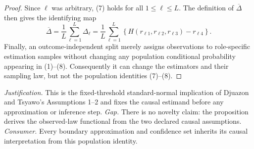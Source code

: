 \documentclass{article}
\begin{document}
\begin{proof}
Since \(\ell\) was arbitrary, (7) holds for all \(1\le \ell\le L\).  The definition of \(\overline\Delta\) then gives the identifying map
\[
\overline\Delta
=\frac{1}{L}\sum_{\ell=1}^{L}\Delta_\ell
=\frac{1}{L}\sum_{\ell=1}^{L}
\left\{H(r_{\ell1},r_{\ell2},r_{\ell3})-r_{\ell4}\right\}.
\tag{8}
\]
Finally, an outcome-independent split merely assigns observations to role-specific estimation samples without changing any population conditional probability appearing in (1)--(8).  Consequently it can change the estimators and their sampling law, but not the population identities (7)--(8).
\end{proof}
\par\smallskip\noindent \textit{Justification.} This is the fixed-threshold standard-normal implication of Djuazon and Tsyawo's Assumptions 1--2 and fixes the causal estimand before any approximation or inference step. \textit{Gap.} There is no novelty claim: the proposition derives the observed-law functional from the two declared causal assumptions. \textit{Consumer.} Every boundary approximation and confidence set inherits its causal interpretation from this population identity.
\end{document}
